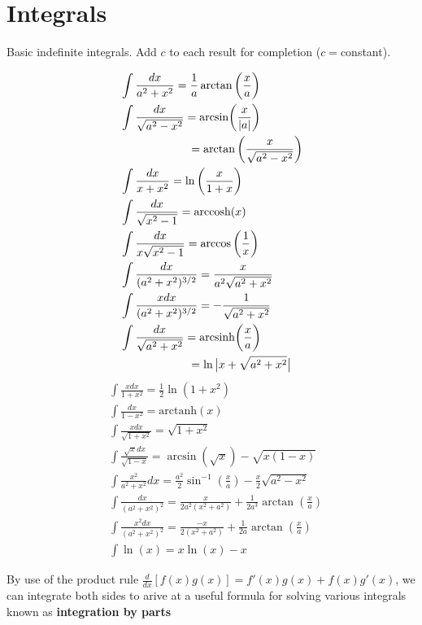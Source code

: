 \chapter{Integrals}
\thispagestyle{fancy}
Basic indefinite integrals. Add $c$ to each result for completion ($c=$constant).
\begin{multicols}{2}
\noindent
\begin{align}
	&\int \frac{dx}{a^2+x^2} = \frac{1}{a}\arctan\bigg(\frac{x}{a}\bigg) \\
	&\int \frac{dx}{\sqrt{a^2-x^2}}= \textrm{arcsin}\bigg(\frac{x}{|a|} \bigg) \\&\hspace{2.1cm}=\arctan\bigg(\frac{x}{\sqrt{a^2-x^2}} \bigg)\\
	&\int \frac{dx}{x+x^2} =\ln\bigg(\frac{x}{1+x} \bigg) \\
	&\int \frac{dx}{\sqrt{x^2-1}} = \textrm{arccosh}(x) \\
	&\int \frac{dx}{x\sqrt{x^2-1}}= \arccos\bigg(\frac{1}{x}\bigg) \\
	&\int \frac{dx}{(a^2+x^2)^{3/2}} = \frac{x}{a^2\sqrt{a^2+x^2}} \\
	&\int \frac{xdx}{(a^2+x^2)^{3/2}} = -\frac{1}{\sqrt{a^2+x^2}} \\
	&\int \frac{dx}{\sqrt{a^2+x^2}} = \textrm{arcsinh}\bigg(\frac{x}{a}\bigg) \\ &\hspace{2.1cm}= \ln\big|x+\sqrt{a^2+x^2}\big|
	\end{align}
	\begin{align}
	&\int \frac{xdx}{1+x^2} =\frac{1}{2}\ln(1+x^2) \\
	&\int \frac{dx}{1-x^2} = \textrm{arctanh}(x) \\
	&\int \frac{xdx}{\sqrt{1+x^2}}= \sqrt{1+x^2} \\
	&\int \frac{\sqrt{x}dx}{\sqrt{1-x}}= \arcsin(\sqrt{x})-\sqrt{x(1-x)} \\
	&\int \frac{x^2}{a^2+x^2} dx=\frac{a^2}{2}\sin^{-1}\left(\frac{x}{a}\right)-\frac{x}{2}\sqrt{a^2-x^2}\\
	&\int \frac{dx}{(a^2+x^2)^2} = \frac{x}{2a^2(x^2+a^2)}+\frac{1}{2a^3}\arctan\left(\frac{x}{a}\right)  \\
	&\int \frac{x^2dx}{(a^2+x^2)^2} = \frac{-x}{2(x^2+a^2)}+\frac{1}{2a}\arctan\left(\frac{x}{a}\right)  \\
	&\int \ln(x)=x\ln(x)-x
\end{align}
\end{multicols}
By use of the product rule $\frac{d}{dx}[f(x)g(x)]=f'(x)g(x)+f(x)g'(x)$, we can integrate both sides to arive at a useful formula for solving various integrals known as \textbf{integration by parts}
